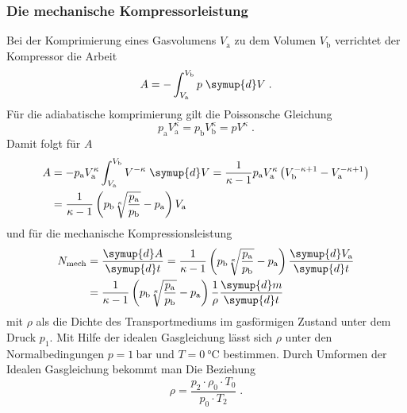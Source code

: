 \subsubsection{Die mechanische Kompressorleistung}
Bei der Komprimierung eines Gasvolumens $V_\text{a}$ zu dem Volumen $V_\text{b}$ 
verrichtet der Kompressor die Arbeit
\begin{equation}
    A = - \int^{V_\text{b}}_{V_\text{a}} p \; \symup{d}V \; \text{.}
\end{equation}
Für die adiabatische komprimierung gilt die Poissonsche Gleichung
\begin{equation}
    p_\text{a} V^\kappa_\text{a} = p_\text{b} V^\kappa_\text{b} = p V^\kappa \;
    \text{.}
\end{equation}
Damit folgt für $A$
\begin{equation}
    \begin{split}
        A &= - p_\text{a} V^\kappa_\text{a} \int^{V_\text{b}}_{V_\text{a}} V^{-\kappa}
        \; \symup{d}V = \frac{1}{\kappa - 1} p_\text{a} V^\kappa_\text{a} \left(
        V^{-\kappa + 1}_\text{b} - V^{-\kappa + 1}_\text{a} \right) \\
        &= \frac{1}{\kappa - 1} \left(p_\text{b} \sqrt[\kappa]{
        \frac{p_\text{a}}{p_\text{b}}} - p_\text{a}\right) V_\text{a}
    \end{split}
\end{equation}
und für die mechanische Kompressionsleistung
\begin{equation}
    \begin{split}
        N_\text{mech} &= \frac{\symup{d}A}{\symup{d}t} = \frac{1}{\kappa - 1}
        \left(p_\text{b} \sqrt[\kappa]{ \frac{p_\text{a}}{p_\text{b}}} 
        - p_\text{a} \right) \frac{\symup{d}V_\text{a}}{\symup{d}t} \\
        &= \frac{1}{\kappa - 1} \left(p_\text{b} \sqrt[\kappa]{ 
        \frac{p_\text{a}}{p_\text{b}}} - p_\text{a}\right) \frac{1}{\rho}
        \frac{\symup{d}m}{\symup{d}t}
        \label{eqn:Kompressor}
    \end{split}
\end{equation}
mit $\rho$ als die Dichte des Transportmediums im gasförmigen Zustand unter dem Druck $p_1$.
Mit Hilfe der idealen Gasgleichung lässt sich $\rho$ unter den Normalbedingungen 
$p = \SI{1}{\bar}$ und $T = \SI{0}{\celsius}$ bestimmen.
Durch Umformen der Idealen Gasgleichung \cite{ggid} bekommt man Die Beziehung
\begin{equation}
    \rho= \frac{p_2\cdot \rho_0\cdot T_0}{p_0\cdot T_2} \; \text{.}
    \label{eqn:gasgleichung}
\end{equation}